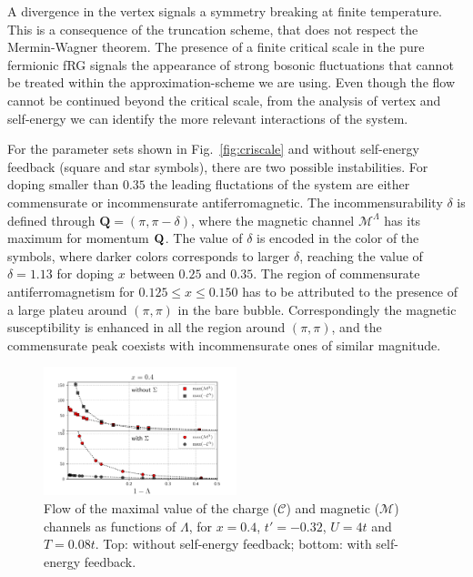A divergence in the vertex signals a symmetry breaking at finite temperature. This is a consequence of the truncation scheme, that does not respect the Mermin-Wagner theorem\cite{Mermin1966}.
The presence of a finite critical scale in the pure fermionic fRG signals the appearance of strong bosonic fluctuations that cannot be treated within the approximation-scheme we are using.\cite{Salmhofer2001} 
Even though the flow cannot be continued beyond the critical scale, from the analysis of vertex and self-energy we can identify the more relevant interactions of the system.

For the parameter sets shown in Fig.~\ref{fig:criscale} and without self-energy feedback (square and star symbols), there are two possible instabilities. 
For doping smaller than $0.35$ the leading fluctations of the system are either commensurate or incommensurate antiferromagnetic.
The incommensurability $\delta$ is defined through $\mathbf{Q}=(\pi,\pi-\delta)$, where the magnetic channel $\mathcal{M}^\Lambda$ has its maximum for momentum $\mathbf{Q}$. 
The value of $\delta$ is encoded in the color of the symbols, where darker colors corresponds to larger $\delta$, reaching the value of $\delta=1.13$ for doping $x$ between $0.25$ and $0.35$. 
The region of commensurate antiferromagnetism for  $0.125\le x \le 0.150$ has to be attributed to the presence of a large plateu around $(\pi,\pi)$ in the bare bubble. Correspondingly the magnetic susceptibility is enhanced in all the region around $(\pi,\pi)$, and the commensurate peak coexists with incommensurate ones of similar magnitude.   
\begin{figure}
\includegraphics[width=0.50\textwidth]{images/chargeproblem_MC_vs_Lambda_fix_occ.png}
\caption{Flow of the maximal value of the charge ($\mathcal{C}$) and magnetic ($\mathcal{M}$) channels as functions of $\Lambda$, for  $x=0.4$, $t'=-0.32$, $U=4t$ and $T=0.08t$.  Top: without self-energy feedback; bottom: with self-energy feedback. }
\label{fig:chargeproblem}
\end{figure}

